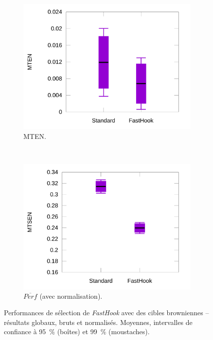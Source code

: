 \begin{figure}[htbp]
\begin{subfigure}[t]{0.49\textwidth}
			\includegraphics[width=\textwidth]{figures/ch5/brownNormErrors}
			\caption{MTEN.}
			\label{fig:brownNormErrors}
		\end{subfigure}
				~
		\begin{subfigure}[t]{0.49\textwidth}
			\centering
			\includegraphics[width=\textwidth]{figures/ch5/brownNormProducts}
			\caption{$\overline{Perf}$ (avec normalisation).}
			\label{fig:brownNormProducts}
		\end{subfigure}
		\caption[\emph{FastHook} -- résultats II]{Performances de sélection de \emph{FastHook} avec des cibles browniennes -- résultats globaux, bruts et normalisés. Moyennes, intervalles de confiance à 95~\%{} (boîtes) et 99~\%{} (moustaches).}
		\label{fig:fastHookBrownAllRes}
	\end{figure}
	
